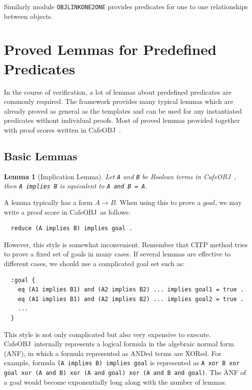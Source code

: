 \documentclass[12pt]{report}
\newtheorem{lemma}{Lemma}
\newcommand{\ra}{\rightarrow}
\newcommand{\stt}[1]{{\small{\tt {#1}}}}
\newcommand{\cafeobj}{{\sf CafeOBJ}~}
\begin{document}
Similarly module {\tt OBJLINKONE2ONE} provides predicates for one to
one relationships between objects.

\section{Proved Lemmas for Predefined Predicates}
\label{sec:lemma}
In the course of verification, a lot of lemmas about predefined
predicates are commonly required.  The framework provides many 
typical lemmas which are already proved as general as the templates
and can be used for any instantiated predicates without individual
proofs. Most of proved lemmas provided together with proof scores
written in \cafeobj.
\subsection{Basic Lemmas}
\label{sec:baselemma}
\begin{lemma}[Implication Lemma]
  Let {\tt A} and {\tt B} be Boolean terms in \cafeobj, then \stt{A
    implies B} is equivalent to \stt{A and B = A}.
\end{lemma}
A lemma typically has a form $A \ra B$. When using this to prove
a $goal$, we may write a proof score in \cafeobj as follows:
\begin{verbatim}
  reduce (A implies B) implies goal .
\end{verbatim}
However, this style is somewhat inconvenient. Remember that CITP
method tries to prove a fixed set of goals in many cases. If several lemmas are
effective to different cases, we should use a complicated goal set such as:
\begin{verbatim}
  :goal {
    eq (A1 implies B1) and (A2 implies B2) ... implies goal1 = true .
    eq (A1 implies B1) and (A2 implies B2) ... implies goal2 = true .
    ...
  }
\end{verbatim}
This style is not only complicated but also very expensive to execute.
\cafeobj internally represents a logical formula in the algebraic
normal form (ANF), in which a formula represented as ANDed terms are
XORed. For example, formula \stt{(A implies B) implies goal} is
represented as \stt{A xor B xor goal xor (A and B) xor (A and goal)
  xor (A and B and goal)}. The ANF of a goal would become
exponentially long along with the number of lemmas.
\end{document}

